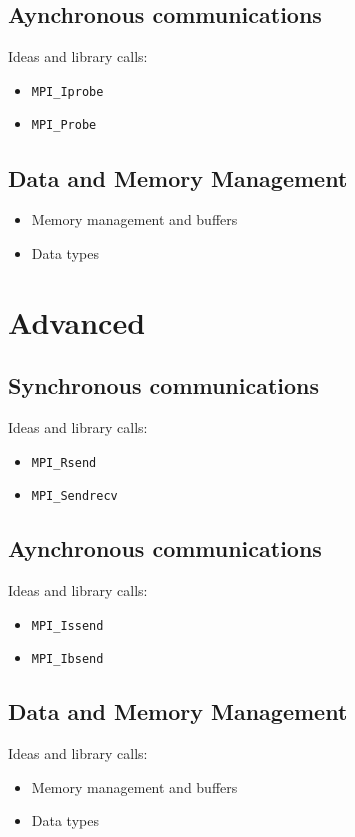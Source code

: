 \subsection{Aynchronous communications}

\todo Ideas and library calls: \\
\begin{itemize}
\item \texttt{MPI\_Iprobe}
\item \texttt{MPI\_Probe}
\end{itemize}

\subsection{Data and Memory Management}

\begin{itemize}
\item Memory management and buffers
\item Data types
\end{itemize}


\section{Advanced}


\subsection{Synchronous communications}

\todo Ideas and library calls: \\
\begin{itemize}
\item \texttt{MPI\_Rsend}
\item \texttt{MPI\_Sendrecv}
\end{itemize}

\subsection{Aynchronous communications}

\todo Ideas and library calls: \\
\begin{itemize}
\item \texttt{MPI\_Issend}
\item \texttt{MPI\_Ibsend}
\end{itemize}

\subsection{Data and Memory Management}

\todo Ideas and library calls: \\
\begin{itemize}
\item Memory management and buffers
\item Data types
\end{itemize}


